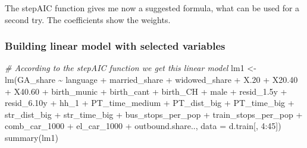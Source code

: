 \documentclass[
]{article}
\newenvironment{Shaded}{\begin{snugshade}}{\end{snugshade}}
\newcommand{\AttributeTok}[1]{\textcolor[rgb]{0.77,0.63,0.00}{#1}}
\newcommand{\CommentTok}[1]{\textcolor[rgb]{0.56,0.35,0.01}{\textit{#1}}}
\newcommand{\DecValTok}[1]{\textcolor[rgb]{0.00,0.00,0.81}{#1}}
\newcommand{\FloatTok}[1]{\textcolor[rgb]{0.00,0.00,0.81}{#1}}
\newcommand{\FunctionTok}[1]{\textcolor[rgb]{0.00,0.00,0.00}{#1}}
\newcommand{\NormalTok}[1]{#1}
\newcommand{\OtherTok}[1]{\textcolor[rgb]{0.56,0.35,0.01}{#1}}
\newcommand{\SpecialCharTok}[1]{\textcolor[rgb]{0.00,0.00,0.00}{#1}}
\begin{document}
The stepAIC function gives me now a suggested formula, what can be used
for a second try. The coefficients show the weights.

\hypertarget{building-linear-model-with-selected-variables}{%
\subsubsection{Building linear model with selected
variables}\label{building-linear-model-with-selected-variables}}

\begin{Shaded}
\begin{Highlighting}[]
\CommentTok{\# According to the stepAIC function we get this linear model}
\NormalTok{lm1 }\OtherTok{\textless{}{-}} \FunctionTok{lm}\NormalTok{(GA\_share }\SpecialCharTok{\textasciitilde{}}\NormalTok{ language }\SpecialCharTok{+}\NormalTok{ married\_share }\SpecialCharTok{+}\NormalTok{ widowed\_share }\SpecialCharTok{+} 
\NormalTok{    X}\FloatTok{.20} \SpecialCharTok{+}\NormalTok{ X20}\FloatTok{.40} \SpecialCharTok{+}\NormalTok{ X40}\FloatTok{.60} \SpecialCharTok{+}\NormalTok{ birth\_munic }\SpecialCharTok{+}\NormalTok{ birth\_cant }\SpecialCharTok{+}\NormalTok{ birth\_CH }\SpecialCharTok{+} 
\NormalTok{    male }\SpecialCharTok{+}\NormalTok{ resid\_1}\FloatTok{.5}\NormalTok{y }\SpecialCharTok{+}\NormalTok{ resid\_6}\FloatTok{.10}\NormalTok{y }\SpecialCharTok{+}\NormalTok{ hh\_1 }\SpecialCharTok{+}\NormalTok{ PT\_time\_medium }\SpecialCharTok{+} 
\NormalTok{    PT\_dist\_big }\SpecialCharTok{+}\NormalTok{ PT\_time\_big }\SpecialCharTok{+}\NormalTok{ str\_dist\_big }\SpecialCharTok{+}\NormalTok{ str\_time\_big }\SpecialCharTok{+} 
\NormalTok{    bus\_stops\_per\_pop }\SpecialCharTok{+}\NormalTok{ train\_stops\_per\_pop }\SpecialCharTok{+}\NormalTok{ comb\_car\_1000 }\SpecialCharTok{+} 
\NormalTok{    el\_car\_1000 }\SpecialCharTok{+}\NormalTok{ outbound.share.., }\AttributeTok{data =}\NormalTok{ d.train[, }\DecValTok{4}\SpecialCharTok{:}\DecValTok{45}\NormalTok{]) }
\FunctionTok{summary}\NormalTok{(lm1)}
\end{Highlighting}
\end{Shaded}
\end{document}
